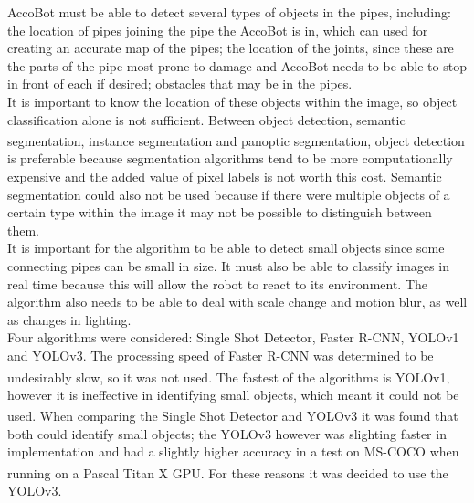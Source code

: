 \documentclass[11pt]{article}		%
\newcommand{\supercite}[1]{\textsuperscript{\cite{#1}}}		%
\begin{document}
	    AccoBot must be able to detect several types of objects in the pipes, including: the location of pipes joining the pipe the AccoBot is in, which can used for creating an accurate map of the pipes; the location of the joints, since these are the parts of the pipe most prone to damage and AccoBot needs to be able to stop in front of each if desired; obstacles that may be in the pipes.
	    \\
        \hspace*{2ex}It is important to know the location of these objects within the image, so object classification alone is not sufficient. Between object detection, semantic segmentation, instance segmentation and panoptic segmentation\supercite{segmentation}, object detection is preferable because segmentation algorithms tend to be more computationally expensive and the added value of pixel labels is not worth this cost. Semantic segmentation could also not be used because if there were multiple objects of a certain type within the image it may not be possible to distinguish between them.
        \\
        \hspace*{2ex}It is important for the algorithm to be able to detect small objects since some connecting pipes can be small in size. It must also be able to classify images in real time because this will allow the robot to react to its environment. The algorithm also needs to be able to deal with scale change and motion blur, as well as changes in lighting.
        \\
        \hspace*{2ex}Four algorithms were considered: Single Shot Detector, Faster R-CNN, YOLOv1 and YOLOv3. The processing speed of Faster R-CNN was determined to be undesirably slow, so it was not used\supercite{YOLO}. The fastest of the algorithms is YOLOv1, however it is ineffective in identifying small objects, which meant it could not be used\supercite{YOLO}. When comparing the Single Shot Detector and YOLOv3 it was found that both could identify small objects; the YOLOv3 however was slighting faster in implementation and had a slightly higher accuracy in a test on MS-COCO when running on a Pascal Titan X GPU\supercite{YOLO}. For these reasons it was decided to use the YOLOv3.
        \\
\end{document}
